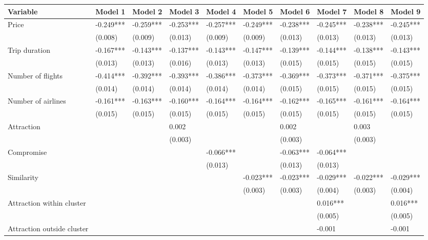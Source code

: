 \documentclass[a4paper,12pt]{article}
\begin{document}
\clearpage

\begin{table}
\centering
\begin{tabular}{p{5cm}*{9}{p{1.7cm}}}
    \hline
        Variable & Model 1 & Model 2 & Model 3 & Model 4 & Model 5 & Model 6 & Model 7 & Model 8 & Model 9 \\ \hline
        \addlinespace
        Price & -0.249*** & -0.259*** & -0.253*** & -0.257*** & -0.249*** & -0.238*** & -0.245*** & -0.238*** & -0.245*** \\ 
         & (0.008) & (0.009) & (0.013) & (0.009) & (0.009) & (0.013) & (0.013) & (0.013) & (0.013) \\ 
        Trip duration & -0.167*** & -0.143*** & -0.137*** & -0.143*** & -0.147*** & -0.139*** & -0.144*** & -0.138*** & -0.143*** \\ 
         & (0.013) & (0.013) & (0.016) & (0.013) & (0.013) & (0.015) & (0.015) & (0.015) & (0.015) \\ 
        Number of flights & -0.414*** & -0.392*** & -0.393*** & -0.386*** & -0.373*** & -0.369*** & -0.373*** & -0.371*** & -0.375*** \\ 
         & (0.014) & (0.014) & (0.014) & (0.014) & (0.014) & (0.015) & (0.015) & (0.015) & (0.015) \\ 
        Number of airlines & -0.161*** & -0.163*** & -0.160*** & -0.164*** & -0.164*** & -0.162*** & -0.165*** & -0.161*** & -0.164*** \\ 
         & (0.015) & (0.015) & (0.015) & (0.015) & (0.015) & (0.015) & (0.015) & (0.015) & (0.015) \\ 
        Attraction &  &  & 0.002 &  &  & 0.002 &  & 0.003 &  \\ 
         &  &  & (0.003) &  &  & (0.003) &  & (0.003) &  \\ 
        Compromise &  &  &  & -0.066*** &  & -0.063*** & -0.064*** &  &  \\ 
         &  &  &  & (0.013) &  & (0.013) & (0.013) &  &  \\ 
        Similarity &  &  &  &  & -0.023*** & -0.023*** & -0.029*** & -0.022*** & -0.029*** \\ 
         &  &  &  &  & (0.003) & (0.003) & (0.004) & (0.003) & (0.004) \\ 
        Attraction within cluster &  &  &  &  &  &  & 0.016*** &  & 0.016*** \\ 
         &  &  &  &  &  &  & (0.005) &  & (0.005) \\ 
        Attraction outside cluster &  &  &  &  &  &  & -0.001 &  & -0.001 \\ 

\end{tabular}
\end{table}
\end{document}

